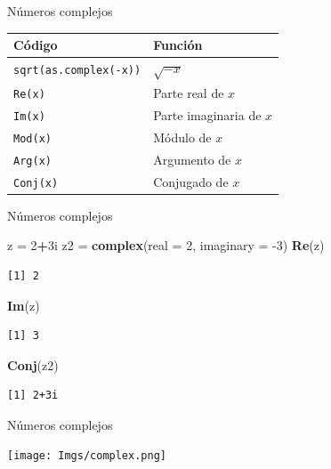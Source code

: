 \documentclass[
  ignorenonframetext,
]{beamer}
\newenvironment{Shaded}{\begin{snugshade}}{\end{snugshade}}
\newcommand{\DataTypeTok}[1]{\textcolor[rgb]{0.13,0.29,0.53}{#1}}
\newcommand{\DecValTok}[1]{\textcolor[rgb]{0.00,0.00,0.81}{#1}}
\newcommand{\KeywordTok}[1]{\textcolor[rgb]{0.13,0.29,0.53}{\textbf{#1}}}
\newcommand{\NormalTok}[1]{#1}
\newcommand{\OperatorTok}[1]{\textcolor[rgb]{0.81,0.36,0.00}{\textbf{#1}}}
\newcommand{\StringTok}[1]{\textcolor[rgb]{0.31,0.60,0.02}{#1}}
\begin{document}
\begin{frame}[fragile]{Números complejos}
\protect\hypertarget{nuxfameros-complejos-1}{}

\begin{longtable}[]{@{}ll@{}}
\toprule
Código & Función\tabularnewline
\midrule
\endhead
\texttt{sqrt(as.complex(-x))} & \(\sqrt{-x}\)\tabularnewline
\texttt{Re(x)} & Parte real de \(x\)\tabularnewline
\texttt{Im(x)} & Parte imaginaria de \(x\)\tabularnewline
\texttt{Mod(x)} & Módulo de \(x\)\tabularnewline
\texttt{Arg(x)} & Argumento de \(x\)\tabularnewline
\texttt{Conj(x)} & Conjugado de \(x\)\tabularnewline
\bottomrule
\end{longtable}

\end{frame}

\begin{frame}[fragile]{Números complejos}
\protect\hypertarget{nuxfameros-complejos-2}{}

\begin{Shaded}
\begin{Highlighting}[]
\NormalTok{z =}\StringTok{ }\DecValTok{2}\OperatorTok{+}\NormalTok{3i}
\NormalTok{z2 =}\StringTok{ }\KeywordTok{complex}\NormalTok{(}\DataTypeTok{real =} \DecValTok{2}\NormalTok{, }\DataTypeTok{imaginary =} \DecValTok{-3}\NormalTok{)}
\KeywordTok{Re}\NormalTok{(z)}
\end{Highlighting}
\end{Shaded}

\begin{verbatim}
[1] 2
\end{verbatim}

\begin{Shaded}
\begin{Highlighting}[]
\KeywordTok{Im}\NormalTok{(z)}
\end{Highlighting}
\end{Shaded}

\begin{verbatim}
[1] 3
\end{verbatim}

\begin{Shaded}
\begin{Highlighting}[]
\KeywordTok{Conj}\NormalTok{(z2)}
\end{Highlighting}
\end{Shaded}

\begin{verbatim}
[1] 2+3i
\end{verbatim}

\end{frame}

\begin{frame}{Números complejos}
\protect\hypertarget{nuxfameros-complejos-3}{}

\texttt{[image: Imgs/complex.png]}

\end{frame}
\end{document}
